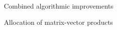 \documentclass[aspectratio=169, leqno, 12pt]{beamer}
\begin{document}
\begin{frame}{Combined algorithmic improvements}
    \centering
    \scalebox{0.8}{}
\end{frame}

\begin{frame}{Allocation of matrix-vector products}
    \centering
    
\end{frame}
\end{document}
